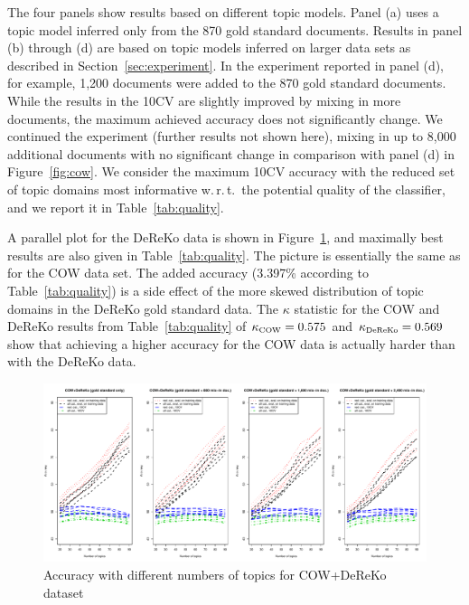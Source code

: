\documentclass[11pt]{article}
\begin{document}
The four panels show results based on different topic models.
Panel (a) uses a topic model inferred only from the 870 gold standard documents.
Results in panel (b) through (d) are based on topic models inferred on larger data sets as described in Section~\ref{sec:experiment}.
In the experiment reported in panel (d), for example, 1,200 documents were added to the 870 gold standard documents.
While the results in the 10CV are slightly improved by mixing in more documents, the maximum achieved accuracy does not significantly change.
We continued the experiment (further results not shown here), mixing in up to 8,000 additional documents with no significant change in comparison with panel (d) in Figure~\ref{fig:cow}.
We consider the maximum 10CV accuracy with the reduced set of topic domains most informative w.\,r.\,t.\ the potential quality of the classifier, and we report it in Table~\ref{tab:quality}.


A parallel plot for the DeReKo data is shown in Figure~\ref{fig:coreko}, and maximally best results are also given in Table~\ref{tab:quality}.
The picture is essentially the same as for the COW data set.
The added accuracy (3.397\% according to Table~\ref{tab:quality}) is a side effect of the more skewed distribution of topic domains in the DeReKo gold standard data.
The $\kappa$ statistic for the COW and DeReKo results from Table~\ref{tab:quality} of $\kappa_{\textrm{\tiny COW}}=0.575$ and $\kappa_{\textrm{\tiny DeReKo}}=0.569$ show that achieving a higher accuracy for the COW data is actually harder than with the DeReKo data.

\begin{figure}[h]
  \centering
  \includegraphics[width=\textwidth]{graphics/coreko.pdf}
  \caption{Accuracy with different numbers of topics for COW+DeReKo dataset}
  \label{fig:coreko}
\end{figure}
\end{document}
